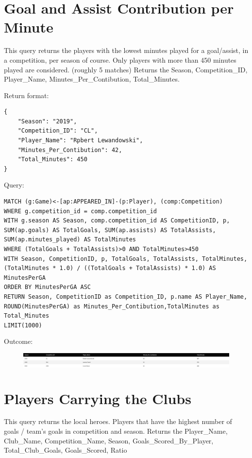 \documentclass{Configuration_Files/PoliMi3i_thesis}
\begin{document}
\section{Goal and Assist Contribution per Minute}
This query returns the players with the lowest minutes played for a goal/assist, in a competition, per season of course.
Only players with more than 450 minutes played are considered. (roughly 5 matches)
Returns the Season, Competition\_ID, Player\_Name, Minutes\_Per\_Contibution, Total\_Minutes.

Return format:
\begin{lstlisting}[style=json]
{
    "Season": "2019",
    "Competition_ID": "CL",
    "Player_Name": "Rpbert Lewandowski",
    "Minutes_Per_Contibution": 42,
    "Total_Minutes": 450
}
\end{lstlisting}


Query:

\begin{lstlisting}[language=Cypher]
MATCH (g:Game)<-[ap:APPEARED_IN]-(p:Player), (comp:Competition)
WHERE g.competition_id = comp.competition_id
WITH g.season AS Season, comp.competition_id AS CompetitionID, p, SUM(ap.goals) AS TotalGoals, SUM(ap.assists) AS TotalAssists, SUM(ap.minutes_played) AS TotalMinutes
WHERE (TotalGoals + TotalAssists)>0 AND TotalMinutes>450
WITH Season, CompetitionID, p, TotalGoals, TotalAssists, TotalMinutes, (TotalMinutes * 1.0) / ((TotalGoals + TotalAssists) * 1.0) AS MinutesPerGA
ORDER BY MinutesPerGA ASC
RETURN Season, CompetitionID as Competition_ID, p.name AS Player_Name, ROUND(MinutesPerGA) as Minutes_Per_Contibution,TotalMinutes as Total_Minutes
LIMIT(1000)
\end{lstlisting}


Outcome:
\begin{figure}[H]
    \centering
    \includegraphics[width=\linewidth]{Project Template/Images/query_output/q9.png}
\end{figure}











\section{Players Carrying the Clubs}
This query returns the local heroes. Players that have the highest number of goals / team's goals in competition and season.
Returns the Player\_Name, Club\_Name, Competition\_Name, Season, Goals\_Scored\_By\_Player, Total\_Club\_Goals, Goals\_Scored, Ratio
\end{document}
